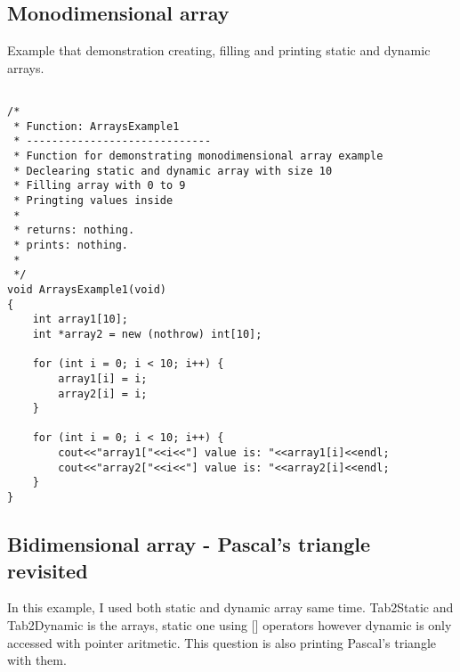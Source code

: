 \documentclass{article}
\begin{document}
		
	\subsection{Monodimensional array}		
	Example that demonstration creating, filling and printing static and dynamic arrays.

		\begin{lstlisting}[label=monodimensional-array,caption=Monodimensional Array Example]	

/*
 * Function: ArraysExample1
 * -----------------------------
 * Function for demonstrating monodimensional array example
 * Declearing static and dynamic array with size 10
 * Filling array with 0 to 9
 * Pringting values inside
 *
 * returns: nothing.
 * prints: nothing.
 *
 */
void ArraysExample1(void)
{
    int array1[10];
    int *array2 = new (nothrow) int[10];
    
    for (int i = 0; i < 10; i++) {
        array1[i] = i;
        array2[i] = i;
    }
    
    for (int i = 0; i < 10; i++) {
        cout<<"array1["<<i<<"] value is: "<<array1[i]<<endl;
        cout<<"array2["<<i<<"] value is: "<<array2[i]<<endl;
    }
}

		\end{lstlisting}
		
	\subsection{Bidimensional array - Pascal's triangle revisited}		
	In this example, I used both static and dynamic array same time. Tab2Static and Tab2Dynamic is the arrays, static one using [] operators however dynamic is only accessed with pointer aritmetic. This question is also printing Pascal's triangle with them.
\end{document}
